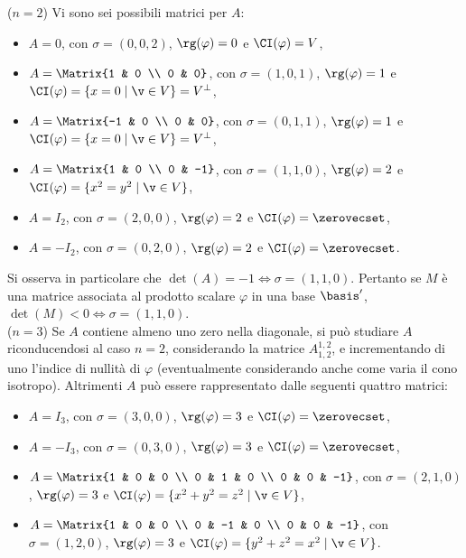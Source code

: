 \vskip 0.1in

\mbox{($n = 2$)} Vi sono sei possibili matrici per $A$:

\begin{itemize}
	\item $A = 0$, con $\sigma = (0, 0, 2)$, $\rg(\varphi) = 0$ e $\CI(\varphi) = V$,
	\item $A = \Matrix{1 & 0 \\ 0 & 0}$, con $\sigma = (1, 0, 1)$, $\rg(\varphi) = 1$ e $\CI(\varphi) = \{x = 0 \mid \v \in V\} = V^\perp$,
	\item $A = \Matrix{-1 & 0 \\ 0 & 0}$, con $\sigma = (0, 1, 1)$, $\rg(\varphi) = 1$ e $\CI(\varphi) = \{x = 0 \mid \v \in V\} = V^\perp$,
	\item $A = \Matrix{1 & 0 \\ 0 & -1}$, con $\sigma = (1, 1, 0)$, $\rg(\varphi) = 2$ e $\CI(\varphi) = \{x^2 = y^2 \mid \v \in V\}$,
	\item $A = I_2$, con $\sigma = (2, 0, 0)$, $\rg(\varphi) = 2$ e $\CI(\varphi) = \zerovecset$,
	\item $A = -I_2$, con $\sigma = (0, 2, 0)$, $\rg(\varphi) = 2$ e $\CI(\varphi) = \zerovecset$.
\end{itemize}

Si osserva in particolare che $\det(A) = -1 \iff \sigma = (1, 1, 0)$. Pertanto se $M$ è una matrice associata
al prodotto scalare $\varphi$ in una base $\basis'$, $\det(M) < 0 \iff \sigma = (1, 1, 0)$. \\

\mbox{($n = 3$)} Se $A$ contiene almeno uno zero nella diagonale, si può studiare $A$ riconducendosi al caso $n = 2$,
considerando la matrice $A^{1,2}_{1,2}$, e incrementando di uno l'indice di nullità di $\varphi$ (eventualmente
considerando anche come varia il cono isotropo). Altrimenti $A$
può essere rappresentato dalle seguenti quattro matrici:

\begin{itemize}
	\item $A = I_3$, con $\sigma = (3, 0, 0)$, $\rg(\varphi) = 3$ e $\CI(\varphi) = \zerovecset$,
	\item $A = -I_3$, con $\sigma = (0, 3, 0)$, $\rg(\varphi) = 3$ e $\CI(\varphi) = \zerovecset$,
	\item $A = \Matrix{1 & 0 & 0 \\ 0 & 1 & 0 \\ 0 & 0 & -1}$, con $\sigma = (2, 1, 0)$, $\rg(\varphi) = 3$ e $\CI(\varphi) = \{ x^2 + y^2 = z^2 \mid \v \in V \}$,
	\item $A = \Matrix{1 & 0 & 0 \\ 0 & -1 & 0 \\ 0 & 0 & -1}$, con $\sigma = (1, 2, 0)$, $\rg(\varphi) = 3$ e $\CI(\varphi) = \{ y^2 + z^2 = x^2 \mid \v \in V \}$.
\end{itemize}


